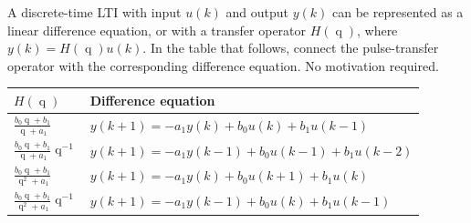 \documentclass[letterpaper,12pt]{scrartcl}
\newenvironment{exercise}[1][Problem]{\begin{trivlist} \item[\hskip
    \labelsep {\stepcounter{exerctr}\bfseries #1
      \arabic{exerctr}}]}{\end{trivlist}\vspace{10mm}}
\newcounter{exerctr}
\newcommand*{\shift}{\ensuremath{\operatorname{q}}}
\begin{document}
\begin{exercise}
A discrete-time LTI with input $u(k)$ and output $y(k)$ can be represented as a linear difference equation, or with a transfer operator $H(\shift)$, where $y(k) = H(\shift)u(k)$.  
In the table that follows, connect the pulse-transfer operator with the corresponding difference equation. No motivation required.

\def\tsep{5mm}
\begin{center}
\begin{tabular}{|p{5cm}p{8cm}|}
\hline
$H(\shift)$ & Difference equation\\\hline\hline
\vspace*{1mm}$\frac{b_0\shift+b_1}{\shift + a_1}$
& \vspace*{1mm}$y(k+1) = -a_1y(k) + b_0u(k) + b_1u(k-1)$\\[\tsep]
$\frac{b_0\shift+b_1}{\shift + a_1}\shift^{-1}$
& $y(k+1) = -a_1y(k-1) + b_0u(k-1) + b_1u(k-2)$\\[\tsep]
$\frac{b_0\shift+b_1}{\shift^2 + a_1}$
& $y(k+1) = -a_1y(k) + b_0u(k+1) + b_1u(k)$\\[\tsep]
$\frac{b_0\shift+b_1}{\shift^2 + a_1}\shift^{-1}$
& $y(k+1) = -a_1y(k-1) + b_0u(k) + b_1u(k-1)$\\[\tsep]\hline
\end{tabular}
\end{center}
\end{exercise}
\end{document}
